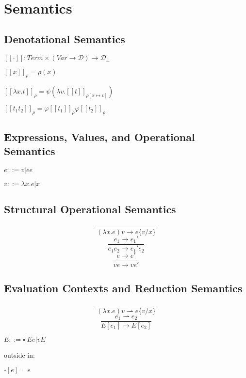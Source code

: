 \chapter{Semantics}

\section{Denotational Semantics}

$[\![ \cdot ]\!] : Term \times (Var \rightarrow \mathcal{D}) \rightarrow \mathcal{D}_{\bot}$

$[\![ x ]\!]_\rho = \rho(x)$

$[\![ \lambda x.t ]\!]_\rho = \psi(\lambda v.[\![t]\!]_{\rho [x \mapsto v]})$

$[\![ t_1 t_2 ]\!]_\rho = \varphi[\![t_1]\!]_\rho \varphi[\![t_2]\!]_\rho$

\section{Expressions, Values, and Operational Semantics}

$e ::= v | e e$

$v ::= \lambda x.e | x$

\section{Structural Operational Semantics}

$$ \frac{}{(\lambda x.e) v \rightarrow e\{v/x\}} $$
$$ \frac{e_1 \rightarrow e_1'}{e_1 e_2 \rightarrow e_1' e_2} $$
$$ \frac{e \rightarrow e'}{v e \rightarrow v e'} $$

\section{Evaluation Contexts and Reduction Semantics}

$$ \frac{}{(\lambda x.e) v \rightharpoonup e\{v/x\}} $$
$$ \frac{e_1 \rightharpoonup e_2}{E[e_1] \rightarrow E[e_2]} $$

$E ::= \square | E e | v E$

outside-in:

$\square[e] = e$

